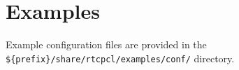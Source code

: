 \documentclass[a4paper,10pt]{article}
\begin{document}
\section{Examples}
\label{sec:examples}

Example configuration files are provided in the
\verb|${prefix}/share/rtcpcl/examples/conf/| directory.

\end{document}
